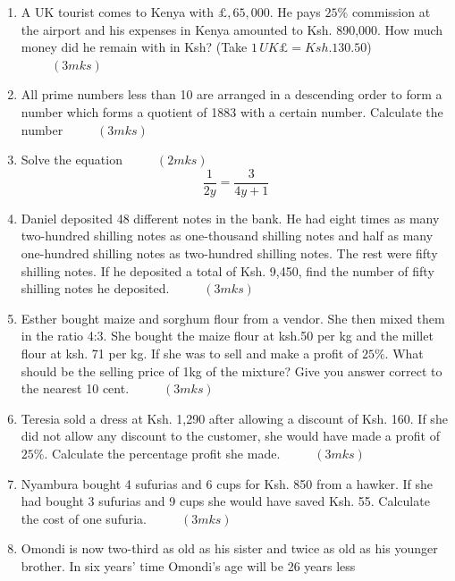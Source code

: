 \documentclass[
  a4paperpaper,
]{scrbook}
\begin{document}
\begin{tcolorbox}
\begin{enumerate}
\def\labelenumi{\arabic{enumi}.}
\setcounter{enumi}{2}
\item
  A UK tourist comes to Kenya with \(\pounds, 65, 000\). He pays
  \(25\%\) commission at the airport and his expenses in Kenya amounted
  to Ksh. 890,000. How much money did he remain with in Ksh? (Take
  \(1\, UK \pounds = Ksh. 130.50\)) \(\hspace{1cm} (3mks)\)
\item
  All prime numbers less than 10 are arranged in a descending order to
  form a number which forms a quotient of 1883 with a certain number.
  Calculate the number \(\hspace{1cm} (3mks)\)
\item
  Solve the equation \(\hspace{1cm} (2mks)\)
  \[\frac{1}{2y}=\frac{3}{4y+1}\]
\item
  Daniel deposited 48 different notes in the bank. He had eight times as
  many two-hundred shilling notes as one-thousand shilling notes and
  half as many one-hundred shilling notes as two-hundred shilling notes.
  The rest were fifty shilling notes. If he deposited a total of Ksh.
  9,450, find the number of fifty shilling notes he deposited.
  \(\hspace{1cm} (3mks)\)
\item
  Esther bought maize and sorghum flour from a vendor. She then mixed
  them in the ratio 4:3. She bought the maize flour at ksh.50 per kg and
  the millet flour at ksh. 71 per kg. If she was to sell and make a
  profit of \(25\%\). What should be the selling price of 1kg of the
  mixture? Give you answer correct to the nearest 10 cent.
  \(\hspace{1cm} (3mks)\)
\item
  Teresia sold a dress at Ksh. 1,290 after allowing a discount of Ksh.
  160. If she did not allow any discount to the customer, she would have
  made a profit of \(25\%\). Calculate the percentage profit she made.
  \(\hspace{1cm} (3mks)\)
\item
  Nyambura bought 4 sufurias and 6 cups for Ksh. 850 from a hawker. If
  she had bought 3 sufurias and 9 cups she would have saved Ksh. 55.
  Calculate the cost of one sufuria. \(\hspace{1cm} (3mks)\)
\item
  Omondi is now two-third as old as his sister and twice as old as his
  younger brother. In six years' time Omondi's age will be 26 years less

\end{enumerate}
\end{tcolorbox}
\end{document}
